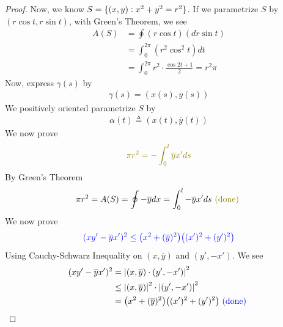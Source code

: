 \documentclass{report}
\begin{document}
\begin{proof}
Now, we know $S=\{ (x,y):x^2+y^2=r^2 \}$. If we parametrize $S$ by  $(r\cos t, r\sin t)$, with Green's Theorem, we see 
\begin{align*}
A(S)&=\oint (r\cos t)(d r\sin t)\\
&=\int_0^{2\pi} (r^2\cos^2 t )dt\\
&=\int_0^{2\pi } r^2\cdot \frac{\cos 2t+1}{2}=r^2\pi 
\end{align*}
Now, express $\gamma (s)$ by
\begin{align*}
\gamma (s)=(x(s),y(s))
\end{align*}
We positively oriented parametrize $S$ by 
\begin{align*}
\alpha (t)\triangleq (x(t),\overline{y}(t)) 
\end{align*}
We now prove 
\begin{align}
\label{pir2}
  \olive{\pi r^2 = -\int_0^l \overline{y}x'ds  }
\end{align}
By Green's Theorem 
\begin{align*}
\pi r^2=A(S)=\oint -\overline{y}dx=\int_0^l -\overline{y}x'ds \odone
\end{align*}
We now prove 
\begin{align}
\label{sqxy}
\textcolor{blue}{(xy'-\overline{y}x')^2 \leq \big(x^2+(\overline{y})^2 \big)\big( (x')^2+(y')^2\big)}
\end{align}
Using Cauchy-Schwarz Inequality on $(x,\overline{y})$ and $(y',-x')$. We see
\begin{align}
  (xy'-\overline{y}x')^2&=\left|(x,\overline{y})\cdot (y',-x')\right|^2\notag\\
                        &\leq \left|(x,\overline{y})\right|^2 \cdot \left|(y',-x')\right|^2\\ \label{CSxy}
  &=\big(x^2+(\overline{y})^2 \big)\big((x')^2+(y')^2 \big)\notag\textcolor{blue}{\text{ (done) }}
\end{align}



\end{proof}
\end{document}
